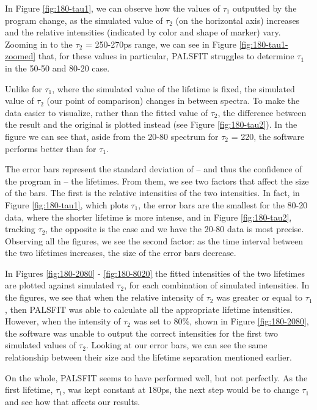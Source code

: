 In Figure \ref{fig:180-tau1}, we can observe how the values of $\tau_1$ outputted by the program change, as the simulated value of $\tau_2$ (on the horizontal axis) increases and the relative intensities (indicated by color and shape of marker) vary. Zooming in to the $\tau_2$ = 250-270ps range, we can see in Figure \ref{fig:180-tau1-zoomed} that, for these values in particular, PALSFIT struggles to determine $\tau_1$ in the 50-50 and 80-20 case. 

Unlike for $\tau_1$, where the simulated value of the lifetime is fixed, the simulated value of $\tau_2$ (our point of comparison) changes in between spectra. To make the data easier to visualize, rather than the fitted value of $\tau_2$, the difference between the result and the original is plotted instead (see Figure \ref{fig:180-tau2}). In the figure we can see that, aside from the 20-80 spectrum for $\tau_2$ = 220, the software performs better than for $\tau_1$.

The error bars represent the standard deviation of -- and thus the confidence of the program in -- the lifetimes. From them, we see two factors that affect the size of the bars. The first is the relative intensities of the two intensities. In fact, in Figure \ref{fig:180-tau1}, which plots $\tau_1$, the error bars are the smallest for the 80-20 data, where the shorter lifetime is more intense, and in Figure \ref{fig:180-tau2}, tracking $\tau_2$, the opposite is the case and we have the 20-80 data is most precise. Observing all the figures, we see the second factor: as the time interval between the two lifetimes increases, the size of the error bars decrease.

In Figures \ref{fig:180-2080} - \ref{fig:180-8020} the fitted intensities of the two lifetimes are plotted against simulated $\tau_2$, for each combination of simulated intensities. In the figures, we see that when the relative intensity of $\tau_2$ was greater or equal to $\tau_1$, then PALSFIT was able to calculate all the appropriate lifetime intensities. However, when the intensity of $\tau_2$ was set to 80\%, shown in Figure \ref{fig:180-2080}, the software was unable to output the correct intensities for the first two simulated values of $\tau_2$. Looking at our error bars, we can see the same relationship between their size and the lifetime separation mentioned earlier.

On the whole, PALSFIT seems to have performed well, but not perfectly. As the first lifetime, $\tau_1$, was kept constant at 180ps, the next step would be to change $\tau_1$ and see how that affects our results. 

